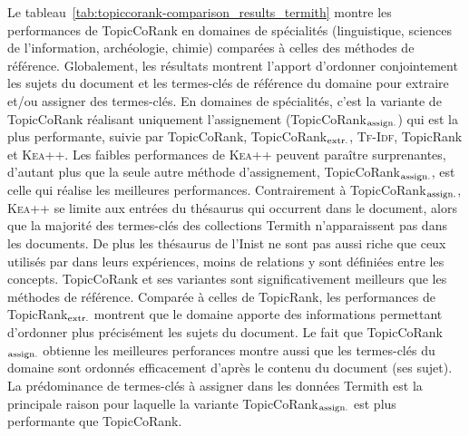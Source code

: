        Le tableau~\ref{tab:topiccorank-comparison_results_termith} montre les
        performances de TopicCoRank en domaines de spécialités (linguistique,
        sciences de l'information, archéologie, chimie) comparées à celles des
        méthodes de référence. Globalement, les résultats montrent l'apport
        d'ordonner conjointement les sujets du document et les termes-clés de
        référence du domaine pour extraire et/ou assigner des termes-clés. En
        domaines de spécialités, c'est la variante de TopicCoRank réalisant
        uniquement l'assignement (TopicCoRank$_\textnormal{assign.}$) qui est la
        plus performante, suivie par TopicCoRank,
        TopicCoRank$_\textnormal{extr.}$, \textsc{Tf-Idf}, TopicRank et
        \textsc{Kea++}. Les faibles performances de \textsc{Kea++} peuvent
        paraître surprenantes, d'autant plus que la seule autre méthode
        d'assignement, TopicCoRank$_\textnormal{assign.}$, est celle qui réalise
        les meilleures performances. Contrairement à
        TopicCoRank$_\textnormal{assign.}$, \textsc{Kea++} se limite aux entrées
        du thésaurus qui occurrent dans le document, alors que la majorité des
        termes-clés des collections Termith n'apparaissent pas dans les
        documents. De plus les thésaurus de l'Inist ne sont pas aussi riche que
        ceux utilisés par  dans leurs expériences,
        moins de relations y sont définiées entre les concepts. TopicCoRank et
        ses variantes sont significativement meilleurs que les méthodes de
        référence. Comparée à celles de TopicRank, les performances de
        TopicRank$_\textnormal{extr.}$ montrent que le domaine apporte des
        informations permettant d'ordonner plus précisément les sujets du
        document. Le fait que TopicCoRank$_\textnormal{assign.}$ obtienne les
        meilleures perforances montre aussi que les termes-clés du domaine sont
        ordonnés efficacement d'après le contenu du document (ses sujet). La
        prédominance de termes-clés à assigner dans les données Termith est la
        principale raison pour laquelle la variante
        TopicCoRank$_\textnormal{assign.}$ est plus performante que TopicCoRank.
